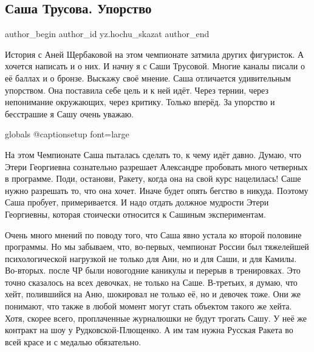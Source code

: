  
 
 
 
 
\subsection{Саша Трусова. Упорство}
\label{sec:18_01_2022.yz.hochu_skazat.1.trusova}

\ifcmt
 author_begin
   author_id yz.hochu_skazat
 author_end
\fi

История с Аней Щербаковой на этом чемпионате затмила других фигуристок. А
хочется написать и о них. И начну я с Саши Трусовой. Многие каналы писали о её
баллах и о бронзе. Выскажу своё мнение. Саша отличается удивительным упорством.
Она поставила себе цель и к ней идёт. Через тернии, через непонимание
окружающих, через критику. Только вперёд. За упорство и бесстрашие я Сашу очень
уважаю.

\ifcmt
	globals
	@captionsetup font=large
\fi


На этом Чемпионате Саша пыталась сделать то, к чему идёт давно. Думаю, что
Этери Георгиевна сознательно разрешает Александре пробовать много четверных в
программе. Поди, останови, Ракету, когда она на свой курс нацелилась! Саше
нужно разрешать то, что она хочет. Иначе будет опять бегство в никуда. Поэтому
Саша пробует, примеривается. И надо отдать должное мудрости Этери Георгиевны,
которая стоически относится к Сашиным экспериментам.


Очень много мнений по поводу того, что Саша явно устала ко второй половине
программы. Но мы забываем, что, во-первых, чемпионат России был тяжелейшей
психологической нагрузкой не только для Ани, но и для Саши, и для Камилы.
Во-вторых. после ЧР были новогодние каникулы и перерыв в тренировках. Это точно
сказалось на всех девочках, не только на Саше. В-третьих, я думаю, что хейт,
полившийся на Аню, шокировал не только её, но и девочек тоже. Они же понимают,
что также в любой момент могут стать объектом такого же хейта. Хотя, скорее
всего, проплаченные журналюшки не будут трогать Сашу. У неё же контракт на шоу
у Рудковской-Плющенко. А им там нужна Русская Ракета во всей красе и с медалью
обязательно. 

